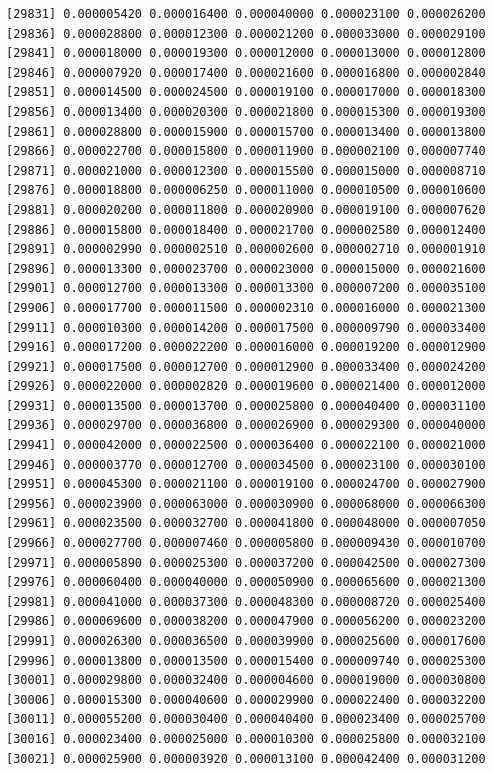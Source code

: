 \documentclass[]{article}
\begin{document}
\begin{verbatim}
[29831] 0.000005420 0.000016400 0.000040000 0.000023100 0.000026200
[29836] 0.000028800 0.000012300 0.000021200 0.000033000 0.000029100
[29841] 0.000018000 0.000019300 0.000012000 0.000013000 0.000012800
[29846] 0.000007920 0.000017400 0.000021600 0.000016800 0.000002840
[29851] 0.000014500 0.000024500 0.000019100 0.000017000 0.000018300
[29856] 0.000013400 0.000020300 0.000021800 0.000015300 0.000019300
[29861] 0.000028800 0.000015900 0.000015700 0.000013400 0.000013800
[29866] 0.000022700 0.000015800 0.000011900 0.000002100 0.000007740
[29871] 0.000021000 0.000012300 0.000015500 0.000015000 0.000008710
[29876] 0.000018800 0.000006250 0.000011000 0.000010500 0.000010600
[29881] 0.000020200 0.000011800 0.000020900 0.000019100 0.000007620
[29886] 0.000015800 0.000018400 0.000021700 0.000002580 0.000012400
[29891] 0.000002990 0.000002510 0.000002600 0.000002710 0.000001910
[29896] 0.000013300 0.000023700 0.000023000 0.000015000 0.000021600
[29901] 0.000012700 0.000013300 0.000013300 0.000007200 0.000035100
[29906] 0.000017700 0.000011500 0.000002310 0.000016000 0.000021300
[29911] 0.000010300 0.000014200 0.000017500 0.000009790 0.000033400
[29916] 0.000017200 0.000022200 0.000016000 0.000019200 0.000012900
[29921] 0.000017500 0.000012700 0.000012900 0.000033400 0.000024200
[29926] 0.000022000 0.000002820 0.000019600 0.000021400 0.000012000
[29931] 0.000013500 0.000013700 0.000025800 0.000040400 0.000031100
[29936] 0.000029700 0.000036800 0.000026900 0.000029300 0.000040000
[29941] 0.000042000 0.000022500 0.000036400 0.000022100 0.000021000
[29946] 0.000003770 0.000012700 0.000034500 0.000023100 0.000030100
[29951] 0.000045300 0.000021100 0.000019100 0.000024700 0.000027900
[29956] 0.000023900 0.000063000 0.000030900 0.000068000 0.000066300
[29961] 0.000023500 0.000032700 0.000041800 0.000048000 0.000007050
[29966] 0.000027700 0.000007460 0.000005800 0.000009430 0.000010700
[29971] 0.000005890 0.000025300 0.000037200 0.000042500 0.000027300
[29976] 0.000060400 0.000040000 0.000050900 0.000065600 0.000021300
[29981] 0.000041000 0.000037300 0.000048300 0.000008720 0.000025400
[29986] 0.000069600 0.000038200 0.000047900 0.000056200 0.000023200
[29991] 0.000026300 0.000036500 0.000039900 0.000025600 0.000017600
[29996] 0.000013800 0.000013500 0.000015400 0.000009740 0.000025300
[30001] 0.000029800 0.000032400 0.000004600 0.000019000 0.000030800
[30006] 0.000015300 0.000040600 0.000029900 0.000022400 0.000032200
[30011] 0.000055200 0.000030400 0.000040400 0.000023400 0.000025700
[30016] 0.000023400 0.000025000 0.000010300 0.000025800 0.000032100
[30021] 0.000025900 0.000003920 0.000013100 0.000042400 0.000031200

\end{verbatim}
\end{document}
